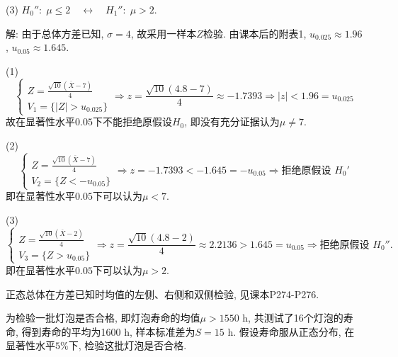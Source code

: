 \documentclass[standard]{ExBook}
\renewenvironment{shaded}{%
  \def\FrameCommand{\fboxsep=\FrameSep \colorbox{shadecolor}}%
  \MakeFramed{\advance\hsize-\width \FrameRestore}%
}{%
  \endMakeFramed
}
\begin{document}
\begin{qitems}
\begin{bbox}
\begin{shaded}
(3) $H_0'': \; \mu \le 2 \quad \longleftrightarrow \quad H_1'': \; \mu > 2$.
    \end{shaded}
    \end{bbox}

\vspace{\dimexpr2.5cm-5em\relax}

解: 由于总体方差已知, $\sigma=4$, 故采用一样本$Z$检验. 由课本后的附表1, $u_{0.025}\approx1.96$, $u_{0.05}\approx1.645$.

(1)
$$
\left\{
\begin{array}{l}
Z=\frac{\sqrt{10}(\overline{X}-7)}{4}\\
V_1=\{|Z|>u_{0.025}\}
\end{array}
\right.
\Longrightarrow
z=\frac{\sqrt{10}(4.8-7)}{4}
\approx-1.7393
\Longrightarrow
|z| < 1.96=u_{0.025}
$$
故在显著性水平$0.05$下不能拒绝原假设$H_0$, 即没有充分证据认为$\mu\neq7$.

(2)
$$
\left\{
\begin{array}{l}
Z=\frac{\sqrt{10}(\overline{X}-7)}{4}\\
V_2=\{Z<-u_{0.05}\}
\end{array}
\right.
\Longrightarrow
z=-1.7393<-1.645=-u_{0.05}
\Longrightarrow
\text{拒绝原假设 }H_0'
$$
即在显著性水平$0.05$下可以认为$\mu<7$.

(3)
$$
\left\{
\begin{array}{l}
Z=\frac{\sqrt{10}(\overline{X}-2)}{4}\\
V_3=\{Z>u_{0.05}\}
\end{array}
\right.
\Longrightarrow
z=\frac{\sqrt{10}(4.8-2)}{4}
\approx2.2136>1.645=u_{0.05}
\Longrightarrow
\text{拒绝原假设 }H_0''.
$$
即在显著性水平$0.05$下可以认为$\mu>2$.

\textcolor{themeColor}{\selectfont {} 正态总体在方差已知时均值的左侧、右侧和双侧检验, 见课本P274-P276.}

\vspace{2.5cm-5em}

    \begin{bbox} 
    \begin{shaded}
        \qitem
为检验一批灯泡是否合格, 即灯泡寿命的均值$\mu > 1550$ h, 共测试了16个灯泡的寿命, 得到寿命的平均为1600 h, 样本标准差为$S = 15$ h. 假设寿命服从正态分布, 在显著性水平$5\%$下, 检验这批灯泡是否合格.
    \end{shaded}
    \end{bbox}


\vspace{\dimexpr2.5cm-5em\relax}


\end{qitems}
\end{document}
